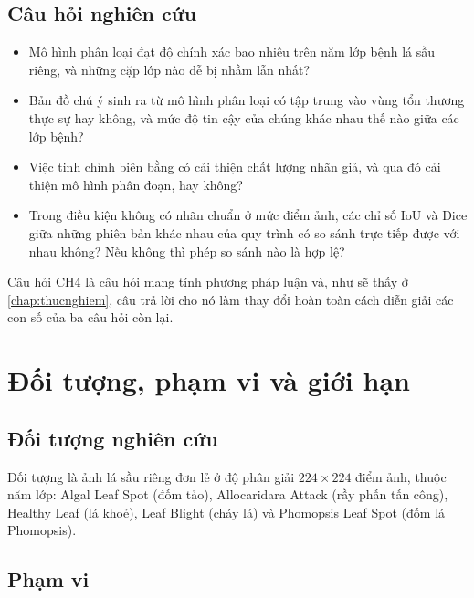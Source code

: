 \subsection{Câu hỏi nghiên cứu}

\begin{itemize}
    \item[\textbf{CH1.}] Mô hình phân loại \EffNet{} đạt độ chính xác bao nhiêu
          trên năm lớp bệnh lá sầu riêng, và những cặp lớp nào dễ bị nhầm lẫn
          nhất?
    \item[\textbf{CH2.}] Bản đồ chú ý sinh ra từ mô hình phân loại có tập trung
          vào vùng tổn thương thực sự hay không, và mức độ tin cậy của chúng khác
          nhau thế nào giữa các lớp bệnh?
    \item[\textbf{CH3.}] Việc tinh chỉnh biên bằng \SAM{} có cải thiện chất lượng
          nhãn giả, và qua đó cải thiện mô hình phân đoạn, hay không?
    \item[\textbf{CH4.}] Trong điều kiện không có nhãn chuẩn ở mức điểm ảnh, các
          chỉ số IoU và Dice giữa những phiên bản khác nhau của quy trình có so
          sánh trực tiếp được với nhau không? Nếu không thì phép so sánh nào là
          hợp lệ?
\end{itemize}

Câu hỏi CH4 là câu hỏi mang tính phương pháp luận và, như sẽ thấy ở
\cref{chap:thucnghiem}, câu trả lời cho nó làm thay đổi hoàn toàn cách diễn giải
các con số của ba câu hỏi còn lại.

\section{Đối tượng, phạm vi và giới hạn}
\label{sec:phamvi}

\subsection{Đối tượng nghiên cứu}

Đối tượng là ảnh lá sầu riêng đơn lẻ ở độ phân giải $224 \times 224$ điểm ảnh,
thuộc năm lớp: Algal Leaf Spot (đốm tảo), Allocaridara Attack (rầy phấn tấn
công), Healthy Leaf (lá khoẻ), Leaf Blight (cháy lá) và Phomopsis Leaf Spot (đốm
lá Phomopsis).

\subsection{Phạm vi}

